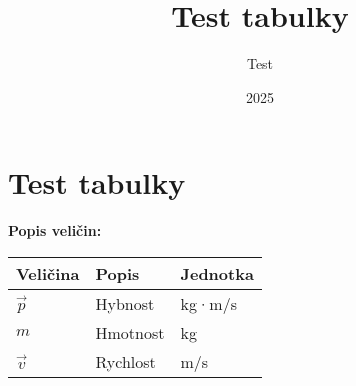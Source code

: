 \documentclass[11pt,a4paper]{article}
\title{Test tabulky}
\author{Test}
\date{2025}
\begin{document}
\section{Test tabulky}

\textbf{Popis veličin:}

\begin{longtable}{lll}
\toprule
Veličina & Popis & Jednotka \\
\midrule
$\vec{p}$ & Hybnost & kg·m/s \\
$m$ & Hmotnost & kg \\
$\vec{v}$ & Rychlost & m/s \\
\bottomrule
\end{longtable}
\end{document}
